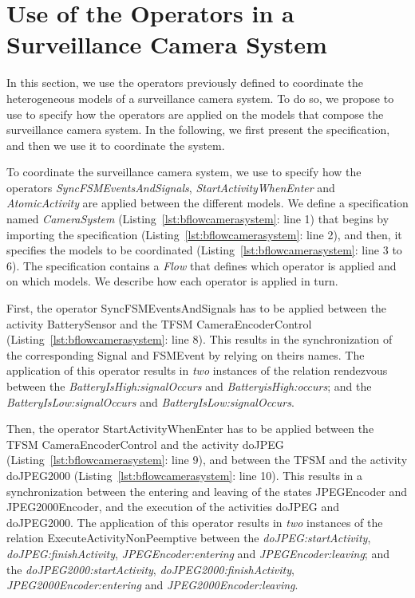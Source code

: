 \section{Use of the Operators in a Surveillance Camera System}
In this section, we use the operators previously defined to coordinate the heterogeneous models of a surveillance camera system. To do so, we propose to use \bflow to specify how the operators are applied on the models that compose the surveillance camera system. In the following, we first present the \bflow specification, and then we use it to coordinate the system. 

To coordinate the surveillance camera system, we use \bflow to specify how the operators \emph{SyncFSMEventsAndSignals}, \emph{StartActivityWhenEnter} and \emph{AtomicActivity} are applied between the different models. We define a \bflow specification named \emph{CameraSystem} (Listing~\ref{lst:bflowcamerasystem}: line 1) that begins by importing the \bcool specification (Listing~\ref{lst:bflowcamerasystem}: line 2), and then, it specifies the models to be coordinated (Listing~\ref{lst:bflowcamerasystem}: line 3 to 6). The specification contains a \emph{Flow} that defines which operator is applied and on which models. We describe how each operator is applied in turn. 

First, the operator SyncFSMEventsAndSignals has to be applied between the activity BatterySensor and the TFSM CameraEncoderControl (Listing~\ref{lst:bflowcamerasystem}: line 8). This results in the synchronization of the corresponding Signal and FSMEvent by relying on theirs names. The application of this operator results in \emph{two} instances of the \ccsl relation rendezvous between the \mse \emph{BatteryIsHigh:signalOccurs} and \emph{BatteryisHigh:occurs}; and the \mse \emph{BatteryIsLow:signalOccurs} and \emph{BatteryIsLow:signalOccurs}. 

Then, the operator StartActivityWhenEnter has to be applied between the TFSM CameraEncoderControl and the activity doJPEG (Listing~\ref{lst:bflowcamerasystem}: line 9), and between the TFSM and the activity doJPEG2000 (Listing~\ref{lst:bflowcamerasystem}: line 10). This results in a synchronization between the entering and leaving of the states JPEGEncoder and JPEG2000Encoder, and the execution of the activities doJPEG and doJPEG2000. The application of this operator results in \emph{two} instances of the \moccml relation ExecuteActivityNonPeemptive between the \mse \emph{doJPEG:startActivity}, \emph{doJPEG:finishActivity}, \emph{JPEGEncoder:entering} and \emph{JPEGEncoder:leaving}; and the \mse \emph{doJPEG2000:startActivity}, \emph{doJPEG2000:finishActivity}, \emph{JPEG2000Encoder:entering} and \emph{JPEG2000Encoder:leaving}.   

